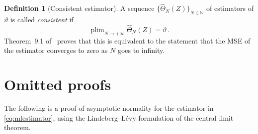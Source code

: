 \documentclass[final]{aomart}
\newtheorem[{}\it]{thm}{Theorem}[section]
\theoremstyle{definition}
\newtheorem{defn}{Definition}[section]
\newtheorem*[{}\it]{notation}{Notation}
\numberwithin{equation}{section}
\newcommand{\wh}{\widehat}
\renewcommand{\theta}{\vartheta}
\newcommand{\hTheta}{\wh{\Theta}} %
\DeclareMathOperator*{\plim}{plim}
\begin{document}
\begin{defn}[Consistent estimator]
	\label{def_consis}
	A sequence \(\{\hTheta_N(Z)\}_{N \in \mathbb{N}}\) of estimators of \(\theta\) is called \emph{consistent} if
	\begin{equation}
	\plim_{N \to +\infty} \hTheta_N(Z) = \theta\,.
	\end{equation}
	Theorem~9.1 of~\cite{wms} proves that this is equivalent to the statement that the MSE of the estimator converges to zero as \(N\) goes to infinity.
\end{defn}

\section{Omitted proofs}
The following is a proof of asymptotic normality for the estimator in \eqref{eq:mlestimator}, using the Lindeberg--Lévy formulation of the central limit theorem.
\end{document}
